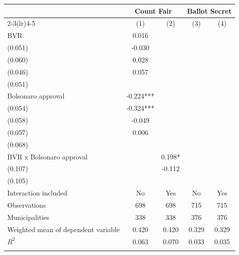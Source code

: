 \begin{tabular*}{\textwidth}{@{\extracolsep{\fill}}lcccc}
\doubletoprule
 & \multicolumn{2}{c}{Count Fair} & \multicolumn{2}{c}{Ballot Secret} \\
\cmidrule(lr){2-3}\cmidrule(lr){4-5}
 & (1) & (2) & (3) & (4) \\
\midrule
BVR & 0.016\\ (0.051) & -0.030\\ (0.060) & 0.028\\ (0.046) & 0.057\\ (0.051) \\
Bolsonaro approval & -0.224***\\ (0.054) & -0.324***\\ (0.058) & -0.049\\ (0.057) & 0.006\\ (0.068) \\
BVR x Bolsonaro approval &  & 0.198*\\ (0.107) &  & -0.112\\ (0.105) \\
\midrule
Interaction included & No & Yes & No & Yes \\
Observations & 698 & 698 & 715 & 715 \\
Municipalities & 338 & 338 & 376 & 376 \\
Weighted mean of dependent variable & 0.420 & 0.420 & 0.329 & 0.329 \\
$R^2$ & 0.063 & 0.070 & 0.033 & 0.035 \\
\doublebottomrule
\end{tabular*}
